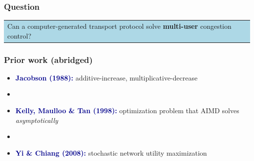\documentclass[svgnames]{beamer}
\begin{document}

\begin{frame}
\frametitle{Question}

\begin{centering}
\colorbox{LightBlue}{
\begin{tabular}{p{4.2 in}}
\LARGE Can a computer-generated transport \mbox{protocol}
solve \textbf{multi-user} congestion control?
\end{tabular}}

\end{centering}

\end{frame}

\begin{frame}
\frametitle{Prior work (abridged)}

\begin{itemize}

\item {\bf \textcolor{DarkBlue}{Jacobson (1988):}} additive-increase, multiplicative-decrease

\item[]

\item {\bf \textcolor{DarkBlue}{Kelly, Maulloo \& Tan (1998):}} optimization problem that AIMD solves {\it asymptotically}

\item[]

\item {\bf \textcolor{DarkBlue}{Yi \& Chiang (2008):}} stochastic network utility maximization

\end{itemize}

\end{frame}
\end{document}
